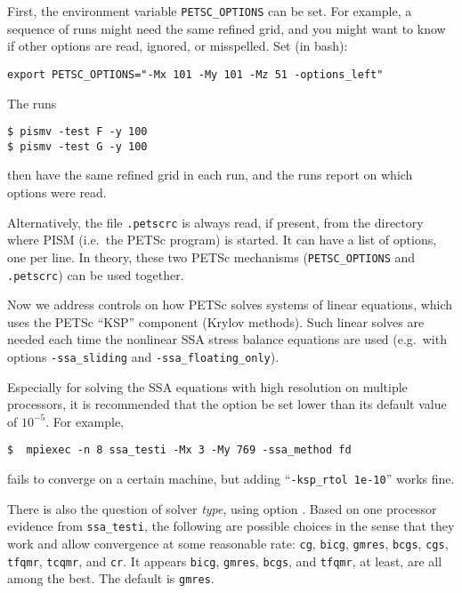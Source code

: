First, the environment variable \texttt{PETSC_OPTIONS} can be set.  For example, a sequence of runs might need the same refined grid, and you might want to know if other options are read, ignored, or misspelled.  Set (in bash):

\texttt{export PETSC_OPTIONS="-Mx 101 -My 101 -Mz 51 -options_left"}

\noindent The runs 
\begin{verbatim}
$ pismv -test F -y 100
$ pismv -test G -y 100
\end{verbatim}
\noindent then have the same refined grid in each run, and the runs report on which options were read.

Alternatively, the file \texttt{.petscrc} is always read, if present, from the directory where PISM (i.e.~the PETSc program) is started.  It can have a list of options, one per line.   In theory, these two PETSc mechanisms (\verb|PETSC_OPTIONS| and \verb|.petscrc|) can be used together.


Now we address controls on how PETSc solves systems of linear equations, which uses the PETSc ``KSP'' component (Krylov methods).  Such linear solves are needed each time the nonlinear SSA stress balance equations are used (e.g.~with options \texttt{-ssa_sliding} and \texttt{-ssa_floating_only}).

Especially for solving the SSA equations with high resolution on multiple processors, it is recommended that the option  be set lower than its default value of $10^{-5}$.  For example, 

\begin{verbatim}
$  mpiexec -n 8 ssa_testi -Mx 3 -My 769 -ssa_method fd
\end{verbatim}

\noindent fails to converge on a certain machine, but adding ``\verb|-ksp_rtol 1e-10|'' works fine.

There is also the question of solver \emph{type}, using option .  Based on one processor evidence from \texttt{ssa_testi}, the following are possible choices in the sense that they work and allow convergence at some reasonable rate: \texttt{cg}, \texttt{bicg}, \texttt{gmres}, \texttt{bcgs}, \texttt{cgs}, \texttt{tfqmr}, \texttt{tcqmr}, and \texttt{cr}.  It appears \texttt{bicg}, \texttt{gmres}, \texttt{bcgs}, and \texttt{tfqmr}, at least, are all among the best.  The default is \texttt{gmres}.

